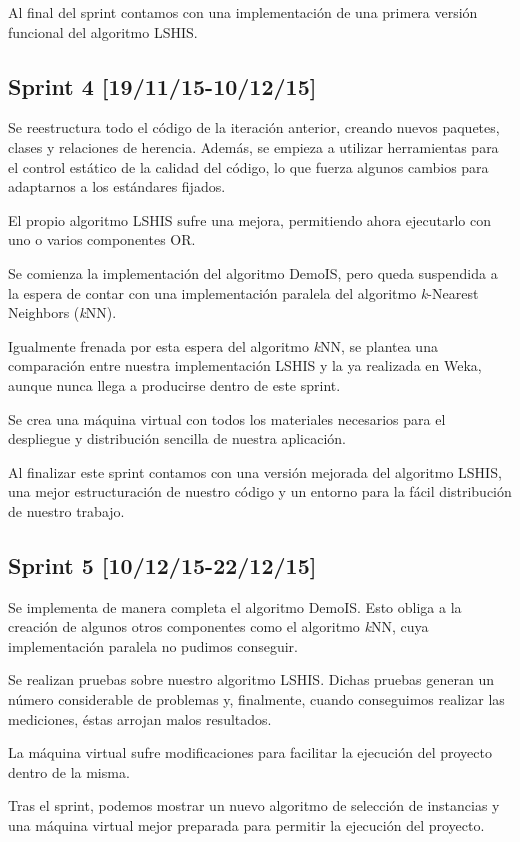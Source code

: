 Al final del sprint contamos con una implementación de una primera versión funcional del algoritmo LSHIS.

\subsection{Sprint 4 [19/11/15-10/12/15]}

Se reestructura todo el código de la iteración anterior, creando nuevos paquetes, clases y relaciones de herencia. Además, se empieza a utilizar herramientas para el control estático de la calidad del código, lo que fuerza algunos cambios para adaptarnos a los estándares fijados.

El propio algoritmo LSHIS sufre una mejora, permitiendo ahora ejecutarlo con uno o varios componentes OR.

Se comienza la implementación del algoritmo DemoIS, pero queda suspendida a la espera de contar con una implementación paralela del algoritmo \textit{k}-Nearest Neighbors (\textit{k}NN).

Igualmente frenada por esta espera del algoritmo \textit{k}NN, se plantea una comparación entre nuestra implementación LSHIS y la ya realizada en Weka, aunque nunca llega a producirse dentro de este sprint.

Se crea una máquina virtual con todos los materiales necesarios para el despliegue y distribución sencilla de nuestra aplicación.

Al finalizar este sprint contamos con una versión mejorada del algoritmo LSHIS, una mejor estructuración de nuestro código y un entorno para la fácil distribución de nuestro trabajo.

\subsection{Sprint 5 [10/12/15-22/12/15]}

Se implementa de manera completa el algoritmo DemoIS. Esto obliga a la creación de algunos otros componentes como el algoritmo \textit{k}NN, cuya implementación paralela no pudimos conseguir.

Se realizan pruebas sobre nuestro algoritmo LSHIS. Dichas pruebas generan un número considerable de problemas y, finalmente, cuando conseguimos realizar las mediciones, éstas arrojan malos resultados.

La máquina virtual sufre modificaciones para facilitar la ejecución del proyecto dentro de la misma.

Tras el sprint, podemos mostrar un nuevo algoritmo de selección de instancias y una máquina virtual mejor preparada para permitir la ejecución del proyecto.

